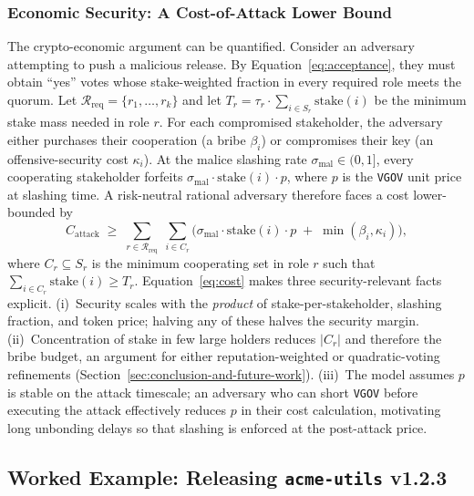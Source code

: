 \documentclass{article}
\begin{document}
\subsubsection{Economic Security: A Cost-of-Attack Lower Bound}
\label{sec:econ-security}

The crypto-economic argument can be quantified. Consider an adversary attempting to push a malicious release. By Equation~\ref{eq:acceptance}, they must obtain ``yes'' votes whose stake-weighted fraction in every required role meets the quorum. Let $\mathcal{R}_{\text{req}} = \{r_1, \dots, r_k\}$ and let $T_r = \tau_r \cdot \sum_{i \in S_r} \text{stake}(i)$ be the minimum stake mass needed in role $r$. For each compromised stakeholder, the adversary either purchases their cooperation (a bribe $\beta_i$) or compromises their key (an offensive-security cost $\kappa_i$). At the malice slashing rate $\sigma_{\text{mal}} \in (0, 1]$, every cooperating stakeholder forfeits $\sigma_{\text{mal}} \cdot \text{stake}(i) \cdot p$, where $p$ is the \texttt{VGOV} unit price at slashing time. A risk-neutral rational adversary therefore faces a cost lower-bounded by
\begin{equation}
C_{\text{attack}} \;\geq\; \sum_{r \in \mathcal{R}_{\text{req}}}\; \sum_{i \in C_r} \big(\sigma_{\text{mal}} \cdot \text{stake}(i) \cdot p \;+\; \min(\beta_i,\kappa_i)\big),
\label{eq:cost}
\end{equation}
where $C_r \subseteq S_r$ is the minimum cooperating set in role $r$ such that $\sum_{i \in C_r} \text{stake}(i) \geq T_r$. Equation~\ref{eq:cost} makes three security-relevant facts explicit. (i)~Security scales with the \emph{product} of stake-per-stakeholder, slashing fraction, and token price; halving any of these halves the security margin. (ii)~Concentration of stake in few large holders reduces $|C_r|$ and therefore the bribe budget, an argument for either reputation-weighted or quadratic-voting refinements (Section~\ref{sec:conclusion-and-future-work}). (iii)~The model assumes $p$ is stable on the attack timescale; an adversary who can short \texttt{VGOV} before executing the attack effectively reduces $p$ in their cost calculation, motivating long unbonding delays so that slashing is enforced at the post-attack price.

\subsection{Worked Example: Releasing \texttt{acme-utils} v1.2.3}
\label{sec:worked-example}
\end{document}
